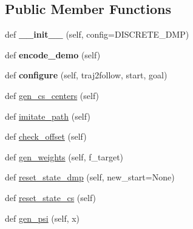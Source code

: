 \subsection*{Public Member Functions}
\begin{DoxyCompactItemize}
\item 
\hypertarget{classaml__lfd_1_1dmp_1_1discrete__dmp__shell_1_1_discrete_d_m_p_shell_afdc79719c645bf1ffd4166faff1ce082}{}\label{classaml__lfd_1_1dmp_1_1discrete__dmp__shell_1_1_discrete_d_m_p_shell_afdc79719c645bf1ffd4166faff1ce082} 
def {\bfseries \+\_\+\+\_\+init\+\_\+\+\_\+} (self, config=D\+I\+S\+C\+R\+E\+T\+E\+\_\+\+D\+MP)
\item 
\hypertarget{classaml__lfd_1_1dmp_1_1discrete__dmp__shell_1_1_discrete_d_m_p_shell_a8e9bcf0d7885c2b6e8bef7b57ea3ffbe}{}\label{classaml__lfd_1_1dmp_1_1discrete__dmp__shell_1_1_discrete_d_m_p_shell_a8e9bcf0d7885c2b6e8bef7b57ea3ffbe} 
def {\bfseries encode\+\_\+demo} (self)
\item 
\hypertarget{classaml__lfd_1_1dmp_1_1discrete__dmp__shell_1_1_discrete_d_m_p_shell_a5d15a53724bb01efe93bc3a176837458}{}\label{classaml__lfd_1_1dmp_1_1discrete__dmp__shell_1_1_discrete_d_m_p_shell_a5d15a53724bb01efe93bc3a176837458} 
def {\bfseries configure} (self, traj2follow, start, goal)
\item 
def \hyperlink{classaml__lfd_1_1dmp_1_1discrete__dmp__shell_1_1_discrete_d_m_p_shell_ab364e2625c5983ba748c212e7cc4b16b}{gen\+\_\+cs\+\_\+centers} (self)
\item 
def \hyperlink{classaml__lfd_1_1dmp_1_1discrete__dmp__shell_1_1_discrete_d_m_p_shell_a2036e592bfd791bf24f238f9636b42ff}{imitate\+\_\+path} (self)
\item 
def \hyperlink{classaml__lfd_1_1dmp_1_1discrete__dmp__shell_1_1_discrete_d_m_p_shell_a10cec75150acb1c2e426fc17ce22bde6}{check\+\_\+offset} (self)
\item 
def \hyperlink{classaml__lfd_1_1dmp_1_1discrete__dmp__shell_1_1_discrete_d_m_p_shell_a369eaa244df73de31517906315c98772}{gen\+\_\+weights} (self, f\+\_\+target)
\item 
def \hyperlink{classaml__lfd_1_1dmp_1_1discrete__dmp__shell_1_1_discrete_d_m_p_shell_a07482e8fe6955be1c72e67258953e298}{reset\+\_\+state\+\_\+dmp} (self, new\+\_\+start=None)
\item 
def \hyperlink{classaml__lfd_1_1dmp_1_1discrete__dmp__shell_1_1_discrete_d_m_p_shell_a26c7a072996b7b5e2cdb13f19e3c3053}{reset\+\_\+state\+\_\+cs} (self)
\item 
def \hyperlink{classaml__lfd_1_1dmp_1_1discrete__dmp__shell_1_1_discrete_d_m_p_shell_a0da4fbcdb74db7ca2d32e5913be72a81}{gen\+\_\+psi} (self, x)

\end{DoxyCompactItemize}
